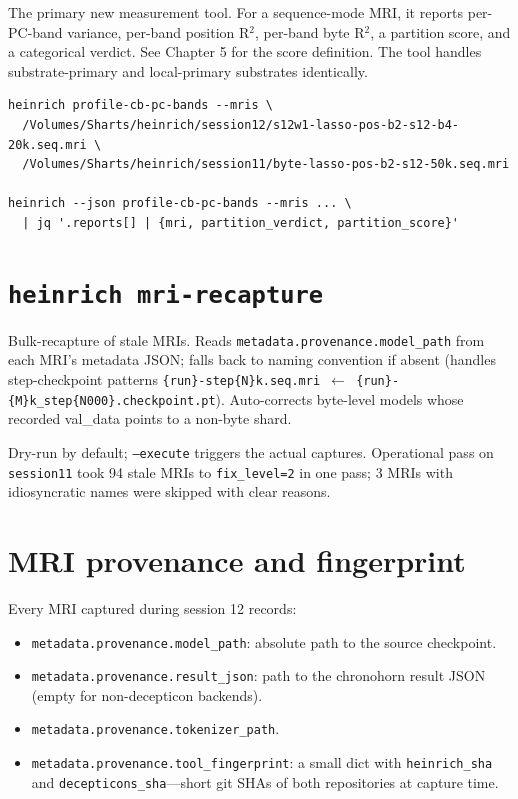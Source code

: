 \documentclass[11pt,openany]{book}
\begin{document}
The primary new measurement tool. For a sequence-mode MRI, it reports
per-PC-band variance, per-band position R$^2$, per-band byte R$^2$, a
partition score, and a categorical verdict. See Chapter 5 for the score
definition. The tool handles substrate-primary and local-primary substrates
identically.

\begin{lstlisting}[caption={Example invocation},basicstyle=\ttfamily\small]
heinrich profile-cb-pc-bands --mris \
  /Volumes/Sharts/heinrich/session12/s12w1-lasso-pos-b2-s12-b4-20k.seq.mri \
  /Volumes/Sharts/heinrich/session11/byte-lasso-pos-b2-s12-50k.seq.mri

heinrich --json profile-cb-pc-bands --mris ... \
  | jq '.reports[] | {mri, partition_verdict, partition_score}'
\end{lstlisting}

\section{\texttt{heinrich mri-recapture}}

Bulk-recapture of stale MRIs. Reads \texttt{metadata.provenance.model\_path}
from each MRI's metadata JSON; falls back to naming convention if absent
(handles step-checkpoint patterns
\texttt{\{run\}-step\{N\}k.seq.mri $\leftarrow$ \{run\}-\{M\}k\_step\{N000\}.checkpoint.pt}).
Auto-corrects byte-level models whose recorded val\_data points to a
non-byte shard.

Dry-run by default; \texttt{--execute} triggers the actual captures.
Operational pass on \texttt{session11} took 94 stale MRIs to
\texttt{fix\_level=2} in one pass; 3 MRIs with idiosyncratic names were
skipped with clear reasons.

\section{MRI provenance and fingerprint}

Every MRI captured during session 12 records:

\begin{itemize}
  \item \texttt{metadata.provenance.model\_path}: absolute path to the
  source checkpoint.
  \item \texttt{metadata.provenance.result\_json}: path to the chronohorn
  result JSON (empty for non-decepticon backends).
  \item \texttt{metadata.provenance.tokenizer\_path}.
  \item \texttt{metadata.provenance.tool\_fingerprint}: a small dict with
  \texttt{heinrich\_sha} and \texttt{decepticons\_sha}---short git SHAs of
  both repositories at capture time.
\end{itemize}
\end{document}
